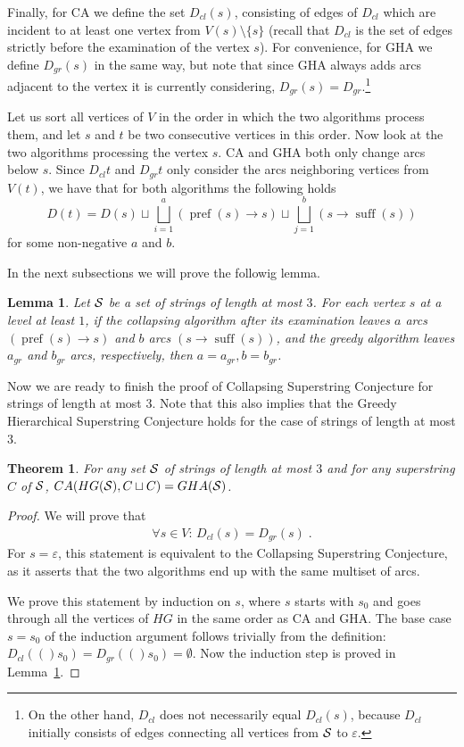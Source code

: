 \documentclass[11pt]{article}
\newtheorem{lemma}{Lemma}
\newtheorem{theorem}{Theorem}
\DeclareMathOperator{\pref}{pref}
\DeclareMathOperator{\suff}{suff}
\newcommand{\cld}{D_{cl}}
\newcommand{\grd}{D_{gr}}
\newcommand{\cldr}[1]{D_{cl}(#1)}
\newcommand{\grdr}[1]{D_{gr}(#1)}
\begin{document}
Finally, for CA we define the set $\cldr{s}$, consisting of edges of $\cld{}$ which are incident to at least one vertex from $ V (s) \setminus \{s \} $ (recall that $\cld{}$ is the set of edges strictly before the examination of the vertex $s$). For convenience, for GHA we define $\grdr{s}$ in the same way, but note that since GHA always adds arcs adjacent to the vertex it is currently considering, $\grdr{s}=\grd$.\footnote{On the other hand, $\cld$ does not necessarily equal $\cldr{s}$, because $\cld{}$ initially consists of edges connecting all vertices from $ {\cal S} $ to $\varepsilon$.}

Let us sort all vertices of $V$ in the order in which the two algorithms process them, and let $s$ and $t$ be two consecutive vertices in this order. Now look at the two algorithms processing the vertex $s$. CA and GHA both only change arcs below $s$. Since $\cld{t}$ and $\grd{t}$ only consider the arcs neighboring vertices from $V(t)$, we have that for both algorithms the following holds
\begin{equation}
\label{eqn:stepcase}
    D(t) = D(s) \sqcup \bigsqcup_{i=1}^{a} (\pref(s) \to s) \sqcup \bigsqcup_{j=1}^{b} (s \to \suff(s))
\end{equation}
for some non-negative $ a $ and $ b $.

In the next subsections we will prove the followig lemma.
\begin{lemma}
\label{lem:technical}
Let ${\cal S}$ be a set of strings of length at most $3$. For each vertex $ s $ at a level at least $1$, if the collapsing algorithm after its examination leaves $ a $ arcs $ (\pref (s) \to s) $ and $ b$ arcs $ (s \to \suff(s) ) $, and the greedy algorithm leaves $ a_{gr} $ and $ b_{gr} $ arcs, respectively, then $ a = a_{gr}, b = b_{gr} $.
\end{lemma}

Now we are ready to finish the proof of Collapsing Superstring Conjecture for strings of length at most $3$. Note that this also implies that the Greedy Hierarchical Superstring Conjecture holds for the case of strings of length at most $3$.

\begin{theorem}
For any set ${\cal S}$ of strings of length at most $3$ and for any superstring $C$ of ${\cal S}$, $CA(HG({\cal S}), C \sqcup C) = GHA({\cal S})$.
\end{theorem}

\begin{proof}
We will prove that
\begin{align*}
\forall s \in V\colon\, \cldr{s}=\grdr{s} \; .
\end{align*}
For $s=\varepsilon$, this statement is equivalent to the Collapsing Superstring Conjecture, as it asserts that the two algorithms end up with the same multiset of arcs. 

We prove this statement by induction on $s$, where $s$ starts with $s_0$ and goes through all the vertices of $HG$ in the same order as CA and GHA. The base case $s=s_0$ of the induction argument follows trivially from the definition: $\cldr(s_0)=\grdr(s_0)=\emptyset$. Now the induction step is proved in Lemma~\ref{lem:technical}.
\end{proof}
%
\end{document}
